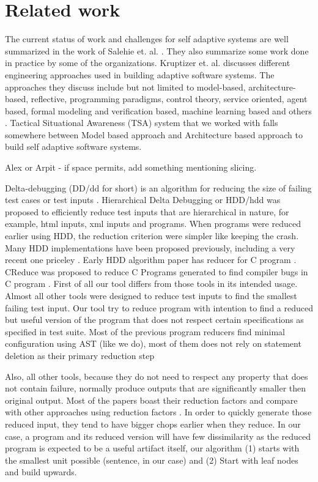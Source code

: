 \section{Related work}

The current status of work and challenges for self adaptive systems are well summarized in the work of Salehie et. al. \cite{selfAdaptation1}. They also summarize some work done in practice by some of the organizations. Kruptizer et. al. \cite{selfAdaptation2} discusses different engineering approaches used in building adaptive software systems. The approaches they discuss include but not limited to model-based, architecture-based, reflective, programming paradigms, control theory, service oriented, agent based, formal modeling and verification based, machine learning based and others \cite{selfAdaptation2}. Tactical Situational Awareness (TSA) system that we worked with falls somewhere between Model based approach \cite{modelBasedAdaptation} and Architecture based approach \cite{architectureBasedAdaptation} to build self adaptive software systems.  


Alex or Arpit - if space permits, add something mentioning slicing.

Delta-debugging (DD/dd for short) is an algorithm for reducing the size of failing test cases or test inputs \cite{ddOriginal}. Hierarchical Delta Debugging \cite{hddOriginal} or HDD/hdd was proposed to efficiently reduce test inputs that are hierarchical in nature, for example, html inputs, xml inputs and programs. When programs were reduced earlier using HDD, the reduction criterion were simpler like keeping the crash. Many HDD implementations have been proposed previously, including a very recent one priceley \cite{hddOriginal,chipperJ,pricieley}. Early HDD algorithm paper has reducer for C program \cite{hddOriginal}. CReduce was proposed to reduce C Programs generated to find compiler bugs in C program \cite{cReduce}. First of all our tool differs from those tools in its intended usage. Almost all other tools were designed to reduce test inputs to find the smallest failing test input. Our tool try to reduce program with intention to find a reduced but useful version of the program that does not respect certain specifications as specified in test suite. Most of the previous program reducers find minimal configuration using AST (like we do), most of them does not rely on statement deletion as their primary reduction step \cite{hddOriginal,hddOriginal} 

Also, all other tools, because they do not need to respect any property that does not contain failure, normally produce outputs that are significantly smaller then original output. Most of the papers boast their reduction factors and compare with other approaches using reduction factors \cite{hddOriginal,chipperJ,pricieley}. In order to quickly generate those reduced input, they tend to have bigger chops earlier when they reduce. In our case, a program and its reduced version will have few dissimilarity as the reduced program is expected to be a useful artifact itself, our algorithm (1) starts with the smallest unit possible (sentence, in our case) and (2) Start with leaf nodes and build upwards.  

